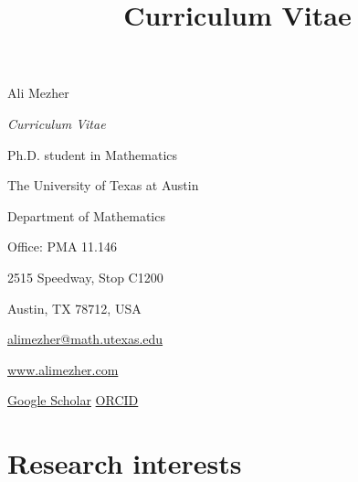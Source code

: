 \documentclass[10pt,a4paper,sans]{moderncv}
\title{Curriculum Vitae}
\begin{document}
\fontsize{10}{12}\selectfont
\recomputelengths
\raggedbottom
\fancyhf{}
\renewcommand{\headrulewidth}{0pt}
\renewcommand{\footrulewidth}{0pt}
\fancyfoot[R]{\small\color{color2}\thepage}
\pagestyle{fancy}

\noindent
\begin{minipage}[t]{0.46\textwidth}
  \vspace{0pt}\raggedright
  {\fontsize{32}{36}\selectfont Ali Mezher\par}
  \vspace{3pt}
  {\fontsize{16}{20}\selectfont\itshape\color{color2}Curriculum Vitae\par}
  \vspace{8pt}
  {\fontsize{10}{12}\selectfont Ph.D. student in Mathematics\par
  The University of Texas at Austin\par}
\end{minipage}\hfill
\begin{minipage}[t]{0.52\textwidth}
  \vspace{3pt}\raggedleft\fontsize{9}{11}\selectfont\color{color2}
  Department of Mathematics\par
  Office: PMA 11.146\par
  2515 Speedway, Stop C1200\par
  Austin, TX 78712, USA\par
  \href{mailto:alimezher@math.utexas.edu}{\color{color2}alimezher@math.utexas.edu}\par
  \href{https://www.alimezher.com/}{\color{color2}www.alimezher.com}\par
  \href{https://scholar.google.com/citations?user=1lPK2k8AAAAJ}{\color{color2}Google Scholar}
  \enspace\textbar\enspace
  \href{https://orcid.org/0000-0002-9215-1804}{\color{color2}ORCID}\par
\end{minipage}
\par\vspace{10pt}

\section{Research interests}
\end{document}
